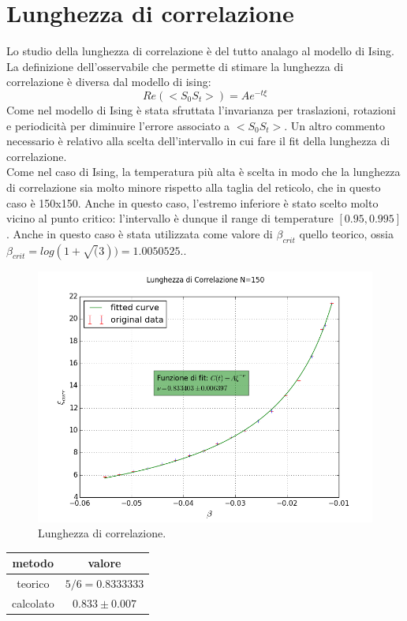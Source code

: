\section{Lunghezza di correlazione}
Lo studio della lunghezza di correlazione è del tutto analago al modello di Ising.\\
La definizione dell'osservabile che permette di stimare la lunghezza di correlazione è diversa dal modello di ising:
$$
	Re(<S_0 S_t>) = A e^{-t \xi}
$$
Come nel modello di Ising è stata sfruttata l'invarianza per traslazioni, rotazioni e periodicità per diminuire l'errore associato a $<S_0 S_t>$.
Un altro commento necessario è relativo alla scelta dell'intervallo in cui fare il fit della lunghezza di correlazione.\\
Come nel caso di Ising, la temperatura più alta è scelta in modo che la lunghezza di correlazione sia molto minore rispetto alla taglia del reticolo, che in questo caso è 150x150. Anche in questo caso, l'estremo inferiore è stato scelto molto vicino al punto critico: l'intervallo è dunque il range di temperature $[0.95,0.995]$.
Anche in questo caso è stata utilizzata come valore di $\beta_{crit}$ quello teorico, ossia
$\beta_{crit} = log(1+\sqrt(3)) = 1.0050525..$
\begin{center}
\begin{figure}[h]
\centering
 	\includegraphics[scale=0.65]{potts/corr150.png}
 	\caption{Lunghezza di correlazione.}
\end{figure}
\end{center}

\begin{center}
\begin{tabular}{c c }

	\toprule
	metodo & valore \\
	\midrule
	teorico & $ 5/6 = 0.8333333 $ \\
	calcolato & $ 0.833 \pm 0.007 $\\

\end{tabular}

\end{center}


